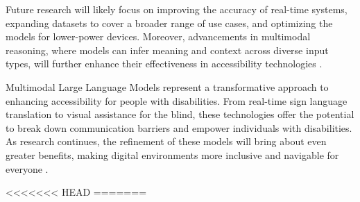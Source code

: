 \documentclass{article}
\begin{document}
Future research will likely focus on improving the accuracy of real-time systems, expanding datasets to cover a broader range of use cases, and optimizing the models for lower-power devices. Moreover, advancements in multimodal reasoning, where models can infer meaning and context across diverse input types, will further enhance their effectiveness in accessibility technologies \cite{vs2023chen}.


Multimodal Large Language Models represent a transformative approach to enhancing accessibility for people with disabilities. From real-time sign language translation to visual assistance for the blind, these technologies offer the potential to break down communication barriers and empower individuals with disabilities. As research continues, the refinement of these models will bring about even greater benefits, making digital environments more inclusive and navigable for everyone \cite{vs2024yang,vs2024song,vs2024li}.





<<<<<<< HEAD
=======
\end{document}

